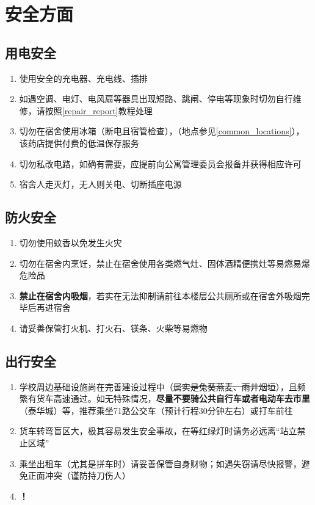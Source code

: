 \chapter[安全方面]{安全方面}
\vspace{-2em}
\section[用电安全]{用电安全}
\begin{enumerate}
    \item 使用安全的充电器、充电线、插排
    \item 如遇空调、电灯、电风扇等器具出现短路、跳闸、停电等现象时切勿自行维修，请按照\uline{\ref{repair_report}}教程处理
    \item 切勿在宿舍使用冰箱（断电且宿管检查），\textbf{}（地点参见\uline{\ref{common_locations}}），该药店提供付费的低温保存服务
    \item 切勿私改电路，如确有需要，应提前向公寓管理委员\footnotemark 会报备并获得相应许可
    \item 宿舍人走灭灯，无人则关电、切断插座电源
\end{enumerate}

\section[防火安全]{防火安全}
\begin{enumerate}
    \item 切勿使用蚊香以免发生火灾
    \item 切勿在宿舍内烹饪，禁止在宿舍使用各类燃气灶、固体酒精便携灶等易燃易爆危险品
    \item \textbf{禁止在宿舍内吸烟}，若实在无法抑制请前往本楼层公共厕所或在宿舍外吸烟完毕后再进宿舍
    \item 请妥善保管打火机、打火石、镁条、火柴等易燃物
\end{enumerate}

\section[出行安全]{出行安全}
\begin{enumerate}
    \item 学校周边基础设施尚在完善建设过程中（\sout{属实是兔葵燕麦、雨井烟垣}），且频繁有货车高速通过。如无特殊情况，\textbf{尽量不要骑公共自行车或者电动车去市里}（泰华城）等，推荐乘坐71路公交车（预计行程30分钟左右）或打车前往
    \item 货车转弯盲区大，极其容易发生安全事故，在等红绿灯时请务必远离“站立禁止区域”
    \item 乘坐出租车（尤其是拼车时）请妥善保管自身财物；如遇失窃请尽快报警，避免正面冲突（谨防持刀伤人）
    \item \textbf{！}
\end{enumerate}

